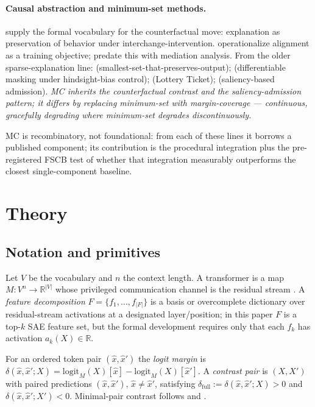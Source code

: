 \documentclass[10pt]{article}
\begin{document}
\paragraph{Causal abstraction and minimum-set methods.} \citet{geiger2021causal} supply the formal vocabulary for the counterfactual move: explanation as preservation of behavior under interchange-intervention. \citet{geiger2022inducing} operationalize alignment as a training objective; \citet{vig2020investigating} predate this with mediation analysis. From the older sparse-explanation line: \citet{lei2016rationalizing} (smallest-set-that-preserves-output); \citet{decao2020diffmask} (differentiable masking under hindsight-bias control); \citet{frankle2019lottery} (Lottery Ticket); \citet{lee2019snip} (saliency-based admission). \emph{MC inherits the counterfactual contrast and the saliency-admission pattern; it differs by replacing minimum-set with margin-coverage --- continuous, gracefully degrading where minimum-set degrades discontinuously.}

MC is recombinatory, not foundational: from each of these lines it borrows a published component; its contribution is the procedural integration plus the pre-registered FSCB test of whether that integration measurably outperforms the closest single-component baseline.

\section{Theory}
\label{sec:theory}

\subsection{Notation and primitives}

Let $V$ be the vocabulary and $n$ the context length. A transformer is a map $M: V^n \to \mathbb{R}^{|V|}$ whose privileged communication channel is the residual stream \citep{elhage2021framework}. A \emph{feature decomposition} $F = \{f_1, \dots, f_{|F|}\}$ is a basis or overcomplete dictionary over residual-stream activations at a designated layer/position; in this paper $F$ is a top-$k$ SAE feature set, but the formal development requires only that each $f_k$ has activation $a_k(X) \in \mathbb{R}$.

For an ordered token pair $(\hat x, \hat x')$ the \emph{logit margin} is $\delta(\hat x, \hat x'; X) = \mathrm{logit}_M(X)[\hat x] - \mathrm{logit}_M(X)[\hat x']$. A \emph{contrast pair} is $(X, X')$ with paired predictions $(\hat x, \hat x')$, $\hat x \neq \hat x'$, satisfying $\delta_{\text{full}} := \delta(\hat x, \hat x'; X) > 0$ and $\delta(\hat x, \hat x'; X') < 0$. Minimal-pair contrast follows \citet{geiger2021causal} and \citet{wang2022interpretability}.
\end{document}
